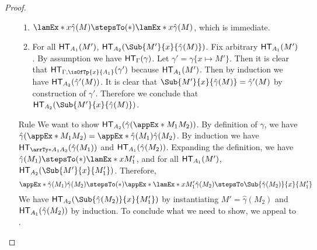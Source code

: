 \documentclass[letterpaper]{article}
\begin{document}
\begin{proof}
\begin{enumerate}
  \begin{enumerate}
    \item $\lamEx*{x}{\hat{\gamma}(M)} \stepsTo(*) \lamEx*{x}{\hat{\gamma}(M)}$, which is immediate.
    \item For all $\HT[A_1](M')$, $\HT[A_2](\Sub{M'}{x}{\hat{\gamma}(M)})$. Fix arbitrary $\HT[A_1](M')$. By assumption we have $\HT[\Gamma](\gamma)$. Let $\gamma' = \gamma\{x \mapsto M'\}$. Then it is clear that $\HT[\Gamma, \isOfTp{x}{A_1}](\gamma')$ because $\HT[A_1](M')$. Then by induction we have $\HT[A_2](\hat{\gamma}'(M))$. It is clear that $\Sub{M'}{x}{\hat{\gamma}(M)} = \hat{\gamma}'(M)$ by construction of $\gamma'$. Therefore we conclude that $\HT[A_2](\Sub{M'}{x}{\hat{\gamma}(M)})$.
  \end{enumerate}
  \item [Rule \ruleref{sta:app}] We want to show $\HT[A_2](\hat{\gamma}(\appEx*{M_1}{M_2}))$. By definition of $\hat{\gamma}$, we have $\hat{\gamma}(\appEx*{M_1}{M_2}) = \appEx*{\hat{\gamma}(M_1)}{\hat{\gamma}(M_2)}$. By induction we have $\HT[\arrTy*{A_1}{A_2}](\hat{\gamma}(M_1))$ and $\HT[A_1](\hat{\gamma}(M_2))$. Expanding the definition, we have $\hat{\gamma}(M_1) \stepsTo(*) \lamEx*{x}{M_1'}$, and for all $\HT[A_1](M')$, $\HT[A_2](\Sub{M'}{x}{M_1'})$. Therefore, $$\appEx*{\hat{\gamma}(M_1)}{\hat{\gamma}(M_2)} \stepsTo(*) \appEx*{\lamEx*{x}{M_1'}}{\hat{\gamma}(M_2)} \stepsTo \Sub{\hat{\gamma}(M_2)}{x}{M_1'}$$ We have $\HT[A_2]{(\Sub{\hat{\gamma}(M_2)}{x}{M_1'})}$ by instantiating $M' = \hat{\gamma}(M_2)$ and $\HT[A_1](\hat{\gamma}(M_2))$ by induction. To conclude what we need to show, we appeal to .
\end{enumerate}

\end{proof}
\end{document}
